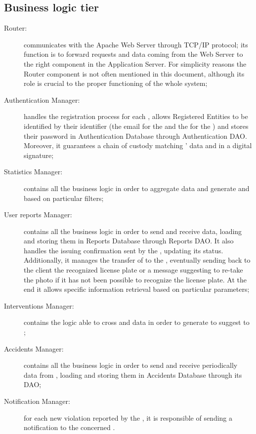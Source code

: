 \documentclass[../../DD.tex]{subfiles}
\begin{document}
\subsection{Business logic tier\label{sect:2.2.3}}
	\begin{description}
	\item[Router:] communicates with the Apache Web Server through TCP/IP protocol; its function is to forward requests and data coming from the Web Server to the right component in the Application Server. For simplicity reasons the Router component is not often mentioned in this document, although its role is crucial to the proper functioning of the whole system;
	 
	\item[Authentication Manager:] handles the registration process for each , allows Registered Entities to be identified by their identifier (the email for the  and the  for the ) and stores their password in Authentication Database through Authentication DAO. Moreover, it guarantees a chain of custody matching ' data and  in a digital signature;
	
	\item[Statistics Manager:] contains all the business logic in order to aggregate  data and generate  and   based on particular filters;
	
	\item[User reports Manager:] contains all the business logic in order to send and receive  data, loading and storing them in Reports Database through Reports DAO. It also handles the  issuing confirmation sent by the , updating its status. Additionally, it manages the transfer of  to the , eventually sending back to the client the recognized license plate or a message suggesting to re-take the photo if it has not been possible to recognize the license plate. At the end it allows specific  information retrieval based on particular parameters;
	
	\item[Interventions Manager:] contains the logic able to cross  and  data in order to generate  to suggest to ;
	
	\item[Accidents Manager:] contains all the business logic in order to send and receive periodically  data from , loading and storing them in Accidents Database through its DAO;
	
	\item[Notification Manager:] for each new violation reported by the , it is responsible of sending a notification to the concerned .
	\end{description}
\end{document}

